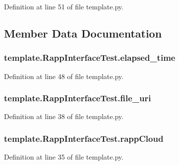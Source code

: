 Definition at line 51 of file template.\-py.



\subsection{Member Data Documentation}
\hypertarget{classtemplate_1_1RappInterfaceTest_a894f5220424cf7b3232125531a15362b}{
\subsubsection[{elapsed\-\_\-time}]{\setlength{\rightskip}{0pt plus 5cm}template.\-Rapp\-Interface\-Test.\-elapsed\-\_\-time}}\label{classtemplate_1_1RappInterfaceTest_a894f5220424cf7b3232125531a15362b}


Definition at line 48 of file template.\-py.

\hypertarget{classtemplate_1_1RappInterfaceTest_a012089ef5d3f918314eaca2c1e055fc5}{
\subsubsection[{file\-\_\-uri}]{\setlength{\rightskip}{0pt plus 5cm}template.\-Rapp\-Interface\-Test.\-file\-\_\-uri}}\label{classtemplate_1_1RappInterfaceTest_a012089ef5d3f918314eaca2c1e055fc5}


Definition at line 38 of file template.\-py.

\hypertarget{classtemplate_1_1RappInterfaceTest_af8acde807af334d32f13f19037cfeba9}{
\subsubsection[{rapp\-Cloud}]{\setlength{\rightskip}{0pt plus 5cm}template.\-Rapp\-Interface\-Test.\-rapp\-Cloud}}\label{classtemplate_1_1RappInterfaceTest_af8acde807af334d32f13f19037cfeba9}


Definition at line 35 of file template.\-py.

